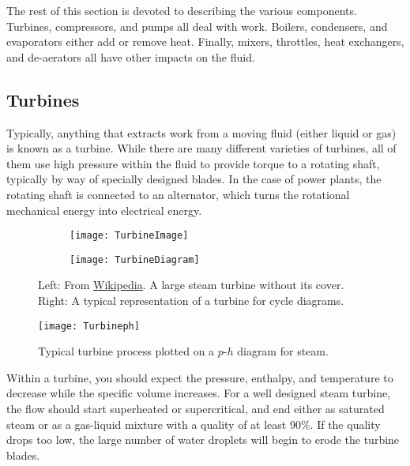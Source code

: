 The rest of this section is devoted to describing the various components.  Turbines, compressors, and pumps all deal with work. Boilers, condensers, and evaporators either add or remove heat. Finally, mixers, throttles, heat exchangers, and de-aerators all have other impacts on the fluid.

\subsection{Turbines} \label{sec:ch4_turbines}

Typically, anything that extracts work from a moving fluid (either liquid or gas) is known as a turbine.  While there are many different varieties of turbines, all of them use high pressure within the fluid to provide torque to a rotating shaft, typically by way of specially designed blades.  In the case of power plants, the rotating shaft is connected to an alternator, which turns the rotational mechanical energy into electrical energy.

\begin{figure}[H]
  \centering
  \begin{subfigure}[b]{0.55\textwidth}
    \centering
    \texttt{[image: TurbineImage]}
   
  \end{subfigure}
  \hfill
  \begin{subfigure}[b]{0.35\textwidth}
    \centering
    \texttt{[image: TurbineDiagram]}
  \end{subfigure}
   \caption{Left: From \href{https://commons.wikimedia.org/wiki/File:BalNPP_m_st2.jpg}{Wikipedia}.  A large steam turbine without its cover.  \\ Right: A typical representation of a turbine for cycle diagrams.}
\label{fig:ch4_turbineDiagram}
\end{figure}

\begin{figure}[H]
\centering
\texttt{[image: Turbineph]}
\caption{Typical turbine process plotted on a $p$-$h$ diagram for steam.}
\label{fig:ch4_turbineph}
\end{figure}

Within a turbine, you should expect the pressure, enthalpy, and temperature to decrease while the specific volume increases.  For a well designed steam turbine, the flow should start superheated or supercritical, and end either as saturated steam or as a gas-liquid mixture with a quality of at least 90\%.  If the quality drops too low, the large number of water droplets will begin to erode the turbine blades.


